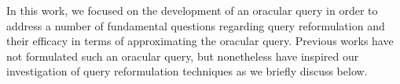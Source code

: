 



In this work, we focused on the development of an oracular query in
order to address a number of fundamental questions regarding query reformulation
and their efficacy in terms of approximating the oracular query.
Previous works have not formulated such an oracular query, but nonetheless
have inspired our investigation of query reformulation techniques 
as we briefly discuss below.
 
